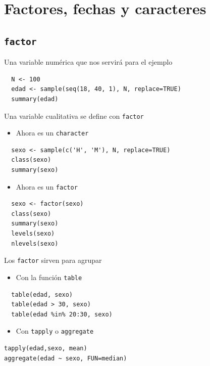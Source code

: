 \documentclass[xcolor={usenames,svgnames,dvipsnames}]{beamer}
\begin{document}
\section{Factores, fechas y caracteres}
\label{sec-5}
\subsection{\texttt{factor}}
\label{sec-5-1}
\begin{frame}[fragile,label=sec-5-1-1]{Una variable numérica que nos servirá para el ejemplo}
 \lstset{language=R,label= ,caption= ,numbers=none}
\begin{lstlisting}
  N <- 100
  edad <- sample(seq(18, 40, 1), N, replace=TRUE)
  summary(edad)
\end{lstlisting}
\end{frame}

\begin{frame}[fragile,label=sec-5-1-2]{Una variable cualitativa se define con \texttt{factor}}
 \begin{itemize}
\item Ahora es un \texttt{character}
\end{itemize}
\lstset{language=R,label= ,caption= ,numbers=none}
\begin{lstlisting}
  sexo <- sample(c('H', 'M'), N, replace=TRUE)
  class(sexo)
  summary(sexo)
\end{lstlisting}
\begin{itemize}
\item Ahora es un \texttt{factor}
\end{itemize}
\lstset{language=R,label= ,caption= ,numbers=none}
\begin{lstlisting}
  sexo <- factor(sexo)
  class(sexo)
  summary(sexo)
  levels(sexo)
  nlevels(sexo)
\end{lstlisting}
\end{frame}

\begin{frame}[fragile,label=sec-5-1-3]{Los \texttt{factor} sirven para agrupar}
 \begin{itemize}
\item Con la función \texttt{table}
\end{itemize}
\lstset{language=R,label= ,caption= ,numbers=none}
\begin{lstlisting}
  table(edad, sexo)
  table(edad > 30, sexo)
  table(edad %in% 20:30, sexo)
\end{lstlisting}

\begin{itemize}
\item Con \texttt{tapply} o \texttt{aggregate}
\end{itemize}
\lstset{language=R,label= ,caption= ,numbers=none}
\begin{lstlisting}
tapply(edad,sexo, mean)
aggregate(edad ~ sexo, FUN=median)
\end{lstlisting}
\end{frame}
\end{document}
